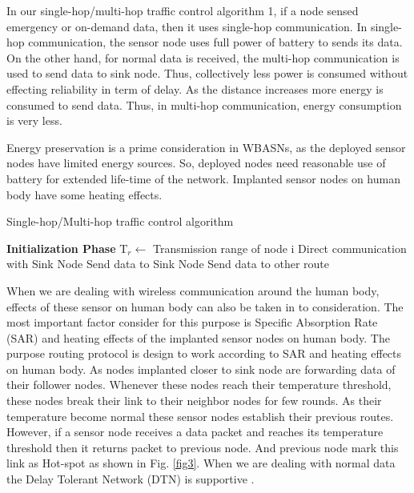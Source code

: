 \documentclass[journal]{IEEEtran}
\begin{document}
In our single-hop/multi-hop traffic control algorithm 1, if a node sensed emergency or on-demand data, then it uses single-hop communication. In single-hop communication, the sensor node uses full power of battery to sends its data. On the other hand, for normal data is received, the multi-hop communication is used to send data to sink node. Thus, collectively less power is consumed without effecting reliability in term of delay. As the distance increases more energy is consumed to send data. Thus, in multi-hop communication, energy consumption is very less.

Energy preservation is a prime consideration in WBASNs, as the deployed sensor nodes  have limited energy sources. So, deployed nodes need reasonable use of battery for extended life-time of the network. Implanted sensor nodes on human body have some heating effects.

\begin{algorithm}[H]
\caption{Single-hop/Multi-hop traffic control algorithm}
\begin{algorithmic}[1]
\STATE \textbf{Initialization Phase}
        \STATE T$_{r} \gets$ Transmission range of node i
         \STATE Direct communication with Sink Node
        \ELSE
         \STATE Send data to Sink Node
                   \STATE Send data to other route
                          \ENDIF
                             \ENDIF
\ENDIF
                             \ENDFOR
                          \end{algorithmic}
                           \end{algorithm}


 When we are dealing with wireless communication around the human body, effects of these sensor on human body can also be taken in to consideration. The most important factor consider for this purpose is Specific Absorption Rate (SAR) and heating effects of the implanted sensor nodes on human body. The purpose routing protocol is design to work according to SAR and heating effects on human body. As nodes implanted closer to sink node are forwarding data of their follower nodes. Whenever these nodes reach their temperature threshold, these nodes break their link to their neighbor nodes for few rounds. As their temperature become normal these sensor nodes establish their previous routes. However, if a sensor node receives a data packet and reaches its temperature threshold then it returns packet to previous node. And previous node mark this link as Hot-spot as shown in Fig.  \ref{fig3}. When we are dealing with normal data the Delay Tolerant Network (DTN) is supportive \cite{1}.
\end{document}
